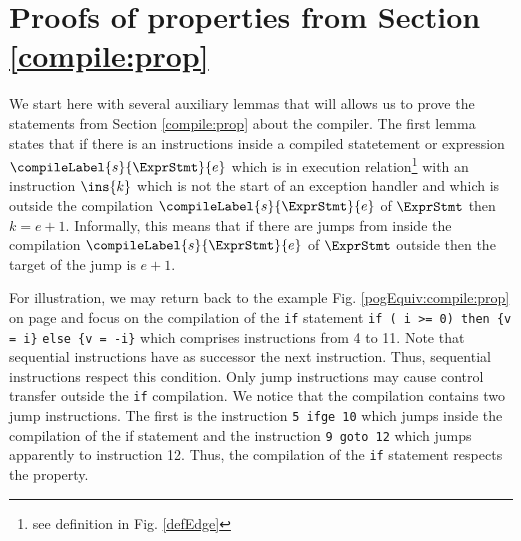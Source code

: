 \newtheorem{compPropApp}{Lemma}[section]


\newtheorem*{compProp3A}{Property  \ref{compile:prop:compProp3}}
\newtheorem*{compProp8A}{Property  \ref{compile:prop:compProp8}}


\section{Proofs of properties from Section \ref{compile:prop} }\label{appendix:compile:prop}

We start here with several auxiliary lemmas that will allows us to prove the statements from Section \ref{compile:prop} 
about the compiler.
The first lemma  states  that  if there is an instructions inside a compiled statetement or expression 
 $\compileLabel{s}{\ExprStmt}{e}$ which   is in execution relation\footnote{see definition in Fig. \ref{defEdge}}  with an instruction 
$\ins{k}$ which is not the start of an exception handler and which is outside the compilation $\compileLabel{s}{\ExprStmt }{e}$
of $\ExprStmt$  then   $ k  = e +1$. Informally,  this means that if there are jumps from inside the compilation  $\compileLabel{s}{\ExprStmt}{e}$  of $\ExprStmt$   
outside then the target of the jump is $e +1$.

For illustration, we may return back to the example Fig. \ref{pogEquiv:compile:prop}  on page \pageref{pogEquiv:compile:prop} and focus on the 
compilation of the \lstinline!if!  statement   
\lstinline!if ( i >= 0) then {v = i}! \lstinline!else {v = -i}! 
which comprises instructions from 4 to 11. Note that sequential instructions   have as  successor the next instruction.  Thus, sequential
instructions respect this condition. 
Only jump instructions may cause control transfer outside the \lstinline!if! compilation. 
We notice that the compilation contains two jump instructions. 
The first is the instruction \lstinline!5 ifge 10! which jumps inside the compilation of the if statement
and the instruction \lstinline!9 goto 12!  which jumps apparently to instruction 12. 
Thus, the compilation of the \lstinline!if! statement respects the property.

